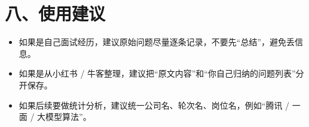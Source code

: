 \documentclass[UTF8,a4paper,11pt]{ctexart}
\begin{document}
\section*{八、使用建议}

\begin{itemize}
  \item 如果是自己面试经历，建议原始问题尽量逐条记录，不要先“总结”，避免丢信息。
  \item 如果是从小红书 / 牛客整理，建议把“原文内容”和“你自己归纳的问题列表”分开保存。
  \item 如果后续要做统计分析，建议统一公司名、轮次名、岗位名，例如“腾讯 / 一面 / 大模型算法”。
\end{itemize}
\end{document}
